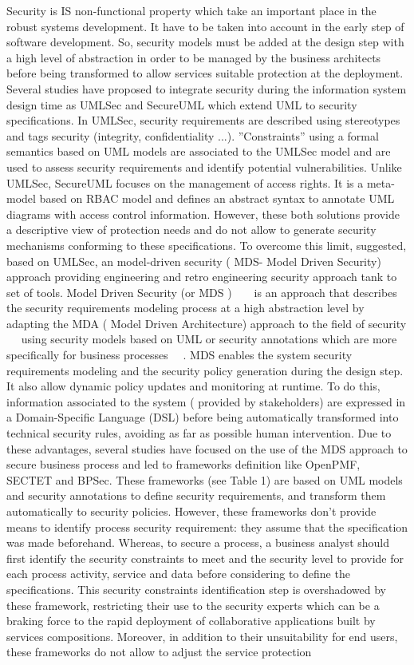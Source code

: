 \documentclass[runningheads,a4paper]{llncs}
\begin{document}
Security is IS non-functional property which take an important place in the robust systems development. It have to be taken into account in the early step of software development. So, security models must be added at the design step with a high level of abstraction in order to be managed by the business architects before being transformed to allow services suitable protection at the deployment.
Several studies have proposed to integrate security during the information system design time as UMLSec and SecureUML which extend UML to security specifications. In UMLSec, security requirements are described using stereotypes and tags security (integrity, confidentiality ...). ”Constraints” using a formal semantics based on UML models are associated to the UMLSec model and are used to assess security requirements and identify potential vulnerabilities. Unlike UMLSec, SecureUML focuses on the management of access rights. It is a meta-model based on RBAC model and defines an abstract syntax to annotate UML diagrams with access control information. However, these both solutions provide a descriptive view of protection needs and do not allow to generate security mechanisms conforming to these specifications. To overcome this limit, suggested, based on UMLSec, an model-driven security ( MDS- Model Driven Security) approach providing engineering and retro engineering security approach tank to set of tools. Model Driven Security (or MDS )  ~\cite{LS09} ~\cite{LZN14} is an approach that describes the security requirements modeling process at a high abstraction level by adapting the MDA ( Model Driven Architecture) approach to the field of security  ~\cite{BDL03}~\cite{CSB08} using security models based on UML or security annotations which are more specifically for business processes ~\cite{SSL09}~\cite{WMS09}. MDS enables the system security requirements modeling and the security policy generation during the design step. It also allow dynamic policy updates and monitoring at runtime. To do this, information associated to the system ( provided by stakeholders) are expressed in a Domain-Specific Language (DSL) before being automatically transformed into technical security rules, avoiding as far as possible human intervention. Due to these advantages, several studies have focused on the use of the MDS approach to secure business process and led to frameworks definition like OpenPMF, SECTET and BPSec. These frameworks (see Table 1) are based on UML models and security annotations to define security requirements, and transform them automatically to security policies. However, these frameworks don’t provide means to identify process security requirement: they assume that the specification was made beforehand. Whereas, to secure a process, a business analyst should first identify the security constraints to meet and the security level to provide for each process activity, service and data before considering to define the specifications. This security constraints identification step is overshadowed by these framework, restricting their use to the security experts which can be a braking force to the rapid deployment of collaborative applications built by services compositions. Moreover, in addition to their unsuitability for end users, these frameworks do not allow to adjust the service protection 
\end{document}
